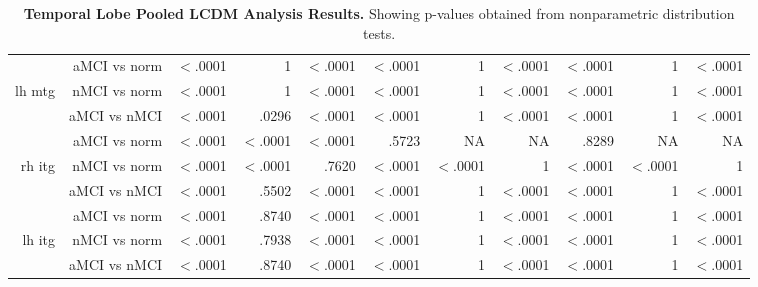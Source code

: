 \documentclass[12pt]{article}
\newcommand\T{\rule{0pt}{2.6ex}}
\begin{document}
\begin{sidewaystable}
\begin{tabular}{rr|rrr|rrr|rrr}
		& aMCI vs norm\T & $<$.0001 & 1 & $<$.0001 & $<$.0001 & 1 & $<$.0001 & $<$.0001 & 1 & $<$.0001 \\
		lh mtg & nMCI vs norm & $<$.0001 & 1 & $<$.0001 & $<$.0001 & 1  & $<$.0001 & $<$.0001 & 1 & $<$.0001 \\
		& aMCI vs nMCI & $<$.0001 & .0296 & $<$.0001 & $<$.0001 & 1 & $<$.0001 & $<$.0001 & 1 & $<$.0001 \\ \hline
		& aMCI vs norm\T &  $<$.0001 & $<$.0001 & $<$.0001 & .5723 & NA & NA & .8289 & NA & NA \\
		rh itg & nMCI vs norm & $<$.0001 & $<$.0001 & .7620 & $<$.0001 & $<$.0001 & 1 & $<$.0001 & $<$.0001 & 1 \\
		& aMCI vs nMCI & $<$.0001 & .5502 & $<$.0001 & $<$.0001 & 1 & $<$.0001 & $<$.0001 & 1 & $<$.0001 \\ \hline
		& aMCI vs norm\T &  $<$.0001 & .8740 & $<$.0001 &  $<$.0001 & 1 & $<$.0001 &  $<$.0001 & 1 & $<$.0001 \\
		lh itg & nMCI vs norm & $<$.0001 & .7938 & $<$.0001 & $<$.0001 & 1 & $<$.0001 & $<$.0001 & 1 & $<$.0001 \\
		& aMCI vs nMCI & $<$.0001 & .8740 & $<$.0001 & $<$.0001 & 1 & $<$.0001 & $<$.0001 & 1 & $<$.0001 \\
	\end{tabular}
	\caption{\textbf{Temporal Lobe Pooled LCDM Analysis Results.}  Showing p-values obtained from nonparametric distribution tests.}
	\label{Wave1.TL.nonpara}
\end{sidewaystable}
\end{document}
